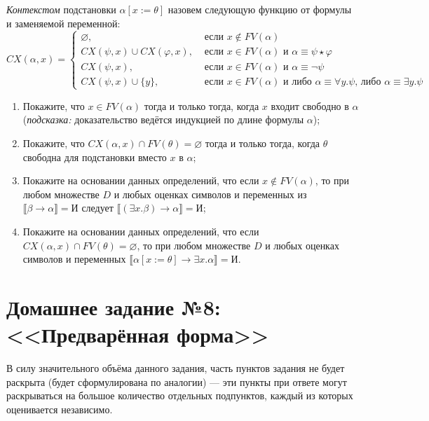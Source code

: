 \documentclass[10pt,a4paper,oneside]{article}
\begin{document}
\begin{enumerate}
\emph{Контекстом} подстановки $\alpha [x := \theta]$ назовем следующую функцию от
формулы и заменяемой переменной:
$$
CX (\alpha, x) = \left\{ \begin{array}{ll}
  \varnothing, &\mbox{ если $x \notin FV(\alpha)$ } \\
  CX (\psi, x) \cup CX (\varphi, x), &\mbox{ если $x \in FV(\alpha)$ и  $\alpha\equiv\psi\star\varphi$ }\\
  CX (\psi, x), &\mbox{ если $x \in FV(\alpha)$ и  $\alpha\equiv\neg\psi$ }\\
  CX (\psi, x) \cup \{y\},  &\mbox{ если $x \in FV(\alpha)$ и либо $\alpha\equiv\forall y.\psi$, либо $\alpha\equiv\exists y.\psi$ }
       \end{array} \right.
$$

\begin{enumerate}
\item Покажите, что $x \in FV(\alpha)$ тогда и только тогда, когда $x$ входит свободно в $\alpha$ 
(\emph{подсказка:} доказательство ведётся индукцией по длине формулы $\alpha$);
\item Покажите, что $CX (\alpha, x) \cap FV(\theta) = \varnothing$ тогда и только тогда,
когда $\theta$ свободна для подстановки вместо $x$ в $\alpha$;
\item Покажите на основании данных определений, что если $x \notin FV(\alpha)$, то
при любом множестве $D$ и любых оценках символов и переменных из 
$\llbracket \beta\rightarrow\alpha \rrbracket = \texttt{И}$ следует 
$\llbracket (\exists x.\beta)\rightarrow\alpha\rrbracket = \texttt{И}$;
\item Покажите на основании данных определений, что если $CX (\alpha, x) \cap FV(\theta) = \varnothing$, 
то при любом множестве $D$ и любых оценках символов и переменных 
$\llbracket \alpha[x:=\theta]\rightarrow\exists x.\alpha\rrbracket = \texttt{И}$. 
\end{enumerate}

\end{enumerate}

\section*{Домашнее задание №8: <<Предварённая форма>>}

В силу значительного объёма данного задания, часть пунктов задания не будет раскрыта
(будет сформулирована по аналогии) — эти пункты при ответе могут раскрываться на большое
количество отдельных подпунктов, каждый из которых оценивается независимо.
\end{document}

